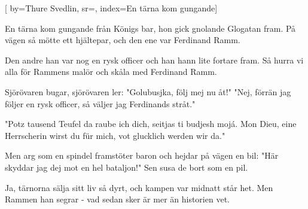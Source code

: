 
[
	by={Thure Svedlin},
	sr={},
	index={En tärna kom gungande}]

\beginverse*
En tärna kom gungande från Königs bar,
hon gick gnolande Glogatan fram.
På vägen så mötte ett hjältepar,
och den ene var Ferdinand Ramm.
\endverse

\beginverse*
Den andre han var nog en rysk officer
och han hann lite fortare fram.
Så hurra vi alla för Rammens malör
och skåla med Ferdinand Ramm.
\endverse

\beginverse*
Sjörövaren bugar, sjörövaren ler:
"Golubusjka, följ mej nu åt!"
"Nej, förrän jag följer en rysk officer,
så väljer jag Ferdinands stråt."
\endverse

\beginverse*
"Potz tausend Teufel da raube ich dich,
seitjas ti budjesh mojá.
Mon Dieu, eine Herrscherin wirst du für mich,
vot glucklich werden wir da."
\endverse

\beginverse*
Men arg som en spindel framstöter baron
och hejdar på vägen en bil:
"Här skyddar jag dej mot en hel bataljon!"
Sen susa de bort som en pil.
\endverse

\beginverse*
Ja, tärnorna sälja sitt liv så dyrt,
och kampen var midnatt står het.
Men Rammen han segrar - vad sedan sker
är mer än historien vet.
\endverse
\endsong